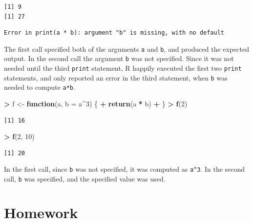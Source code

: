 \documentclass[]{krantz}
\makeatletter
\newenvironment{Shaded}{\begin{snugshade}}{\end{snugshade}}
\newcommand{\ControlFlowTok}[1]{\textcolor[rgb]{0.27,0.27,0.27}{\textbf{#1}}}
\newcommand{\DataTypeTok}[1]{\textcolor[rgb]{0.27,0.27,0.27}{#1}}
\newcommand{\DecValTok}[1]{\textcolor[rgb]{0.06,0.06,0.06}{#1}}
\newcommand{\KeywordTok}[1]{\textcolor[rgb]{0.27,0.27,0.27}{\textbf{#1}}}
\newcommand{\NormalTok}[1]{#1}
\newcommand{\OperatorTok}[1]{\textcolor[rgb]{0.43,0.43,0.43}{\textbf{#1}}}
\newcommand{\StringTok}[1]{\textcolor[rgb]{0.5,0.5,0.5}{#1}}
\newenvironment{kframe}{%
\medskip{}
\setlength{\fboxsep}{.8em}
 \def\at@end@of@kframe{}%
 \ifinner\ifhmode%
  \def\at@end@of@kframe{\end{minipage}}%
  \begin{minipage}{\columnwidth}%
 \fi\fi%
 \def\FrameCommand##1{\hskip\@totalleftmargin \hskip-\fboxsep
 \colorbox{shadecolor}{##1}\hskip-\fboxsep
     \hskip-\linewidth \hskip-\@totalleftmargin \hskip\columnwidth}%
 \MakeFramed {\advance\hsize-\width
   \@totalleftmargin\z@ \linewidth\hsize
   \@setminipage}}%
 {\par\unskip\endMakeFramed%
 \at@end@of@kframe}
\renewenvironment{Shaded}{\begin{kframe}}{\end{kframe}}
\makeatother
\begin{document}
\begin{verbatim}
[1] 9
[1] 27
\end{verbatim}

\begin{verbatim}
Error in print(a * b): argument "b" is missing, with no default
\end{verbatim}

The first call specified both of the arguments \texttt{a} and \texttt{b}, and produced the expected output. In the second call the argument \texttt{b} was not specified. Since it was not needed until the third \texttt{print} statement, R happily executed the first two \texttt{print} statements, and only reported an error in the third statement, when \texttt{b} was needed to compute \texttt{a*b}.

\begin{Shaded}
\begin{Highlighting}[]
\OperatorTok{>}\StringTok{ }\NormalTok{f <-}\StringTok{ }\ControlFlowTok{function}\NormalTok{(a, }\DataTypeTok{b =}\NormalTok{ a}\OperatorTok{^}\DecValTok{3}\NormalTok{) \{}
\OperatorTok{+}\StringTok{   }\KeywordTok{return}\NormalTok{(a }\OperatorTok{*}\StringTok{ }\NormalTok{b)}
\OperatorTok{+}\StringTok{ }\NormalTok{\}}
\OperatorTok{>}\StringTok{ }\KeywordTok{f}\NormalTok{(}\DecValTok{2}\NormalTok{)}
\end{Highlighting}
\end{Shaded}

\begin{verbatim}
[1] 16
\end{verbatim}

\begin{Shaded}
\begin{Highlighting}[]
\OperatorTok{>}\StringTok{ }\KeywordTok{f}\NormalTok{(}\DecValTok{2}\NormalTok{, }\DecValTok{10}\NormalTok{)}
\end{Highlighting}
\end{Shaded}

\begin{verbatim}
[1] 20
\end{verbatim}

In the first call, since \texttt{b} was not specified, it was computed as \texttt{a\^{}3}. In the second call, \texttt{b} was specified, and the specified value was used.

\hypertarget{homework-4}{%
\section{Homework}\label{homework-4}}
\end{document}

